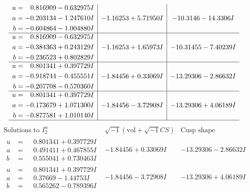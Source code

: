 \documentclass[1p]{elsarticle_modified}
\theoremstyle{definition}
\newcommand{\I}{\sqrt{-1}}
\begin{document}
$$\begin{array}{c|c|c}
\begin{aligned}
u &= \phantom{-}0.816909 - 0.632975 I \\
a &= -0.203134 - 1.247610 I \\
b &= -0.604864 - 1.004880 I\end{aligned}
 & -1.16253 + 5.71950 I & -10.3146 - 14.3306 I \\ \hline\begin{aligned}
u &= \phantom{-}0.816909 - 0.632975 I \\
a &= -0.384363 + 0.243129 I \\
b &= -0.236523 + 0.802829 I\end{aligned}
 & -1.16253 + 1.65973 I & -10.31455 - 7.40239 I \\ \hline\begin{aligned}
u &= \phantom{-}0.801341 + 0.397729 I \\
a &= -0.918744 - 0.455551 I \\
b &= -0.207708 - 0.570360 I\end{aligned}
 & -1.84456 + 0.33069 I & -13.29306 - 2.86632 I \\ \hline\begin{aligned}
u &= \phantom{-}0.801341 + 0.397729 I \\
a &= -0.173679 + 1.071300 I \\
b &= -0.877581 + 1.010140 I\end{aligned}
 & -1.84456 - 3.72908 I & -13.29306 + 4.06189 I\\
 \hline 
 \end{array}$$\newpage$$\begin{array}{c|c|c}  
\text{Solutions to }I^u_{2}& \I (\text{vol} + \sqrt{-1}CS) & \text{Cusp shape}\\
 \hline 
\begin{aligned}
u &= \phantom{-}0.801341 + 0.397729 I \\
a &= \phantom{-}0.491411 + 0.467855 I \\
b &= \phantom{-}0.555041 + 0.730463 I\end{aligned}
 & -1.84456 + 0.33069 I & -13.29306 - 2.86632 I \\ \hline\begin{aligned}
u &= \phantom{-}0.801341 + 0.397729 I \\
a &= \phantom{-}0.37669 - 1.44753 I \\
b &= \phantom{-}0.565262 - 0.789396 I\end{aligned}
 & -1.84456 - 3.72908 I & -13.29306 + 4.06189 I \\ \hline\begin{aligned}

\end{aligned}
\end{array}$$
\end{document}
